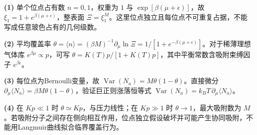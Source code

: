 \par\noindent\textbf{(1)} 单个位点占有数 \(n=0,1\)，权重为 \(1\) 与 \(\exp[\beta(\mu+\epsilon)]\)，故 \(\xi_1=1+e^{\beta(\mu+\epsilon)}\)，整表面 \(\Xi=\xi_1^M\)。这里位点独立且每位点不可重复占据，不能写成任意玻色占有的几何级数。
\par\noindent\textbf{(2)} 平均覆盖率 \(\theta=\langle n\rangle=(\beta M)^{-1}\partial_\mu\ln\Xi=1/[1+e^{-\beta(\mu+\epsilon)}]\)。对于稀薄理想气体库 \(e^{\beta\mu}\propto p\)，可写 \(\theta=K(T)p/[1+K(T)p]\)，其中平衡常数含吸附束缚因子 \(e^{\beta\epsilon}\)。
\par\noindent\textbf{(3)} 每位点为Bernoulli变量，故 \(\operatorname{Var}(N_a)=M\theta(1-\theta)\)。直接微分 \(\partial_\mu\langle N_a\rangle=\beta M\theta(1-\theta)\)，验证巨正则涨落恒等式 \(\operatorname{Var}(N_a)=k_BT\,\partial_\mu\langle N_a\rangle\)。
\par\noindent\textbf{(4)} 在 \(Kp\ll1\) 时 \(\theta\simeq Kp\)，与压力线性；在 \(Kp\gg1\) 时 \(\theta\to1\)，最大吸附数为 \(M\)。若吸附分子之间存在侧向相互作用，位点独立假设破坏并可能产生协同吸附，不能用Langmuir曲线拟合临界覆盖行为。
